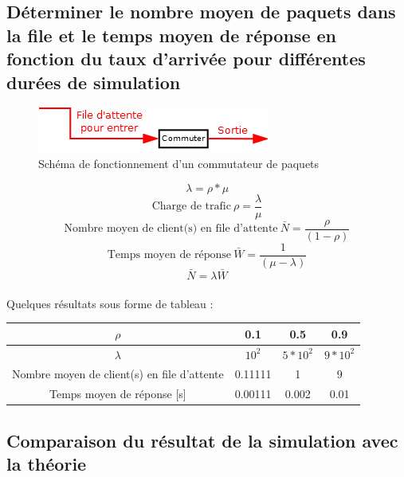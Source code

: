         \subsection{Déterminer le nombre moyen de paquets dans la file et le temps moyen de réponse en fonction du taux d'arrivée pour différentes durées de simulation}
%
            \begin{figure}[h]
                \centering
                \includegraphics[scale=0.7]{RSC/2-1.png}
                \caption{ Schéma de fonctionnement d'un commutateur de paquets }
                \label{ Schema de fonctionnement d'un commutateur de paquets }
            \end{figure}
%
            \[  \lambda = \rho * \mu \]
            \[  \text{Charge de trafic} \ \rho = \frac{\lambda}{\mu} \]
            \[  \text{Nombre moyen de client(s) en file d'attente} \ \bar{N} = \frac{\rho}{(1 - \rho)} \]
            \[  \text{Temps moyen de réponse} \ \bar{W} = \frac{1}{(\mu - \lambda)} \]
            \[  \bar{N} = \lambda \bar{W} \]
%
            \paragraph{}
Quelques résultats sous forme de tableau :
%
            \begin{center}
                \begin{tabular}{ | c | c| c | c | }
                    \hline
                        $\rho$                                          & 0.1       & 0.5           & 0.9           \\
                    \hline
                        $\lambda$                                       & $10^{2}$  & $5 * 10^{2}$  & $9 * 10^{2}$  \\
                    \hline
                        Nombre moyen de client(s) en file d'attente     & 0.11111   & 1             & 9             \\
                    \hline
                        Temps moyen de réponse [s]                      & 0.00111   & 0.002         & 0.01          \\
                    \hline
                \end{tabular}
            \end{center}
%
%
\clearpage
%
%
        \subsection{Comparaison du résultat de la simulation avec la théorie}
%
